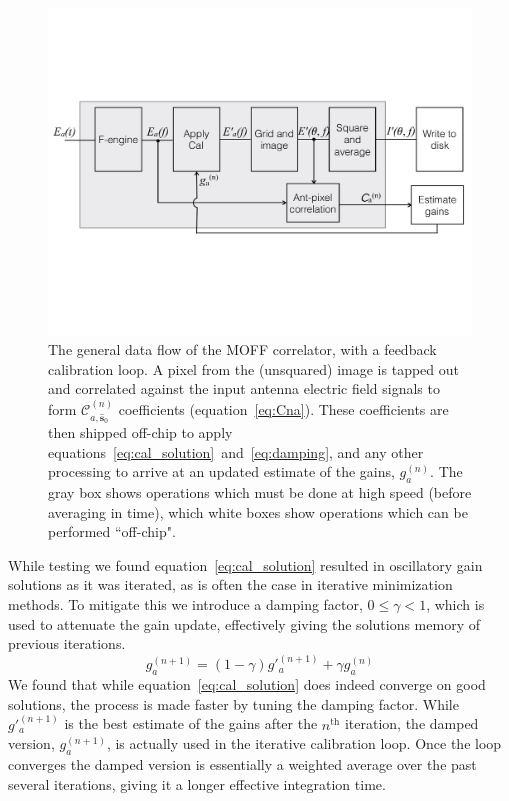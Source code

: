 \documentclass[a4paper,fleqn,usenatbib]{mnras}
\newcommand{\spix}{\ensuremath{\hat{\mathbf{s}}_{0}}}
\newcommand{\Cna}[1][n]{\ensuremath{\mathcal{C}^{(#1)}_{a,\spix}}}
\newcommand{\damp}{\ensuremath{\gamma}}
\begin{document}
\begin{figure}
\begin{center}
\includegraphics[width=\columnwidth]{schematic.pdf}
\caption{The general data flow of the MOFF correlator, with a feedback calibration loop. A pixel from the (unsquared) image is tapped out and correlated against the input antenna electric field signals to form $\Cna$ coefficients (equation~\ref{eq:Cna}). These coefficients are then shipped off-chip to apply equations~\ref{eq:cal_solution}~and~\ref{eq:damping}, and any other processing to arrive at an updated estimate of the gains, $g^{(n)}_a$. The gray box shows operations which must be done at high speed (before averaging in time), which white boxes show operations which can be performed ``off-chip".}
\label{fig:schematic}
\end{center}
\end{figure}

While testing we found equation~\ref{eq:cal_solution} resulted in oscillatory gain solutions as it was iterated, as is often the case in iterative minimization methods. To mitigate this we introduce a damping factor, $0 \leq \damp <1$, which is used to attenuate the gain update, effectively giving the solutions memory of previous iterations.
\begin{equation}\label{eq:damping}
g^{(n+1)}_a = (1-\damp) g'^{(n+1)}_a + \damp g^{(n)}_a
\end{equation}
We found that while equation~\ref{eq:cal_solution} does indeed converge on good solutions, the process is made faster by tuning the damping factor. While $g'^{(n+1)}_a$ is the best estimate of the gains after the $n^{\textrm{th}}$ iteration, the damped version, $g^{(n+1)}_a$, is actually used in the iterative calibration loop. Once the loop converges the damped version is essentially a weighted average over the past several iterations, giving it a longer effective integration time. 
\end{document}
